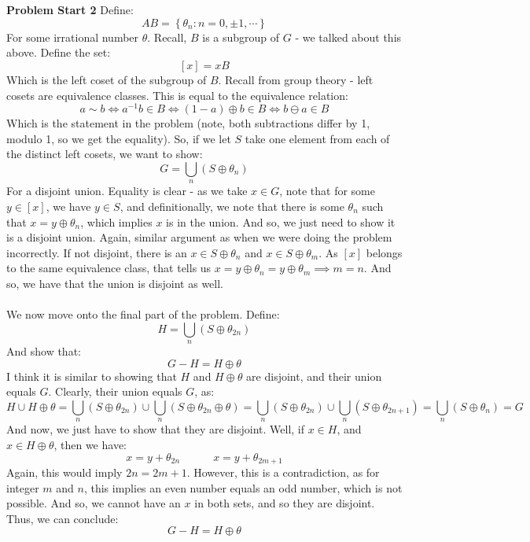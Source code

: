 \documentclass[12pt,a4paper]{article}
\newcommand{\1}[1]{\mathbbm{1}\left\{ #1 \right\}}
\begin{document}
\begin{enumerate}
	\\\\
	\textbf{Problem Start 2} Define:
	$$
		AB = \left\{\theta_n: n = 0, \pm 1, \cdots\right\}
	$$
	For some irrational number $\theta$. Recall, $B$ is a subgroup of $G$ - we talked about this above. Define the set:
	$$
		[x] = xB
	$$
	Which is the left coset of the subgroup of $B$. Recall from group theory - left cosets are equivalence classes. This is equal to the equivalence relation:
	$$
		a \sim b \Leftrightarrow a^{-1}b \in B \Leftrightarrow
		(1 - a) \oplus b \in B \Leftrightarrow b \ominus a \in B
	$$
	Which is the statement in the problem (note, both subtractions differ by 1, modulo 1, so we get the equality). So, if we let $S$ take one element from each of the distinct left cosets, we want to show:
	$$
		G = \bigcup_n (S \oplus \theta_n)
	$$
	For a disjoint union. Equality is clear - as we take $x \in G$, note that for some $y \in [x]$, we have $y \in S$, and definitionally, we note that there is some $\theta_n$ such that $x = y \oplus \theta_n$, which implies $x$ is in the union. And so, we just need to show it is a disjoint union. Again, similar argument as when we were doing the problem incorrectly. If not disjoint, there is an $x \in S \oplus \theta_n$ and $x \in S \oplus \theta_m$. As $[x]$ belongs to the same equivalence class, that tells us $x = y \oplus \theta_n = y \oplus \theta_m \implies m = n$. And so, we have that the union is disjoint as well.
	\\\\
	We now move onto the final part of the problem. Define:
	$$
		H = \bigcup_n (S \oplus \theta_{2n})
	$$
	And show that:
	$$
		G - H = H \oplus \theta
	$$
	I think it is similar to showing that $H$ and $H \oplus \theta$ are disjoint, and their union equals $G$. Clearly, their union equals $G$, as:
	$$
		H \cup H \oplus \theta =
		\bigcup_n (S \oplus \theta_{2n}) \cup \bigcup_n (S \oplus \theta_{2n} \oplus \theta) =
		\bigcup_n (S \oplus \theta_{2n}) \cup \bigcup_n (S \oplus \theta_{2n + 1}) =
		\bigcup_n (S \oplus \theta_n) = G
	$$
	And now, we just have to show that they are disjoint. Well, if $x \in H$, and $x \in H \oplus \theta$, then we have:
	$$
		x = y + \theta_{2n} \quad\quad\quad
		x = y + \theta_{2m + 1}
	$$
	Again, this would imply $2n = 2m + 1$. However, this is a contradiction, as for integer $m$ and $n$, this implies an even number equals an odd number, which is not possible. And so, we cannot have an $x$ in both sets, and so they are disjoint. Thus, we can conclude:
	$$
		G - H = H \oplus \theta
	$$
	

\end{enumerate}
\end{document}
